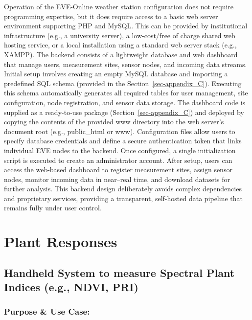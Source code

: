 \documentclass[
  11pt,
  letterpaper,
]{book}
\begin{document}
Operation of the EVE-Online weather station configuration does not
require programming expertise, but it does require access to a basic web
server environment supporting PHP and MySQL. This can be provided by
institutional infrastructure (e.g., a university server), a
low-cost/free of charge shared web hosting service, or a local
installation using a standard web server stack (e.g., XAMPP). The
backend consists of a lightweight database and web dashboard that manage
users, measurement sites, sensor nodes, and incoming data streams.
Initial setup involves creating an empty MySQL database and importing a
predefined SQL schema (provided in the Section~\ref{sec-appendix_C}).
Executing this schema automatically generates all required tables for
user management, site configuration, node registration, and sensor data
storage. The dashboard code is supplied as a ready-to-use package
(Section~\ref{sec-appendix_C}) and deployed by copying the contents of
the provided www directory into the web server's document root (e.g.,
public\_html or www). Configuration files allow users to specify
database credentials and define a secure authentication token that links
individual EVE nodes to the backend. Once configured, a single
initialization script is executed to create an administrator account.
After setup, users can access the web-based dashboard to register
measurement sites, assign sensor nodes, monitor incoming data in
near--real time, and download datasets for further analysis. This
backend design deliberately avoids complex dependencies and proprietary
services, providing a transparent, self-hosted data pipeline that
remains fully under user control.

\section{Plant Responses}\label{sec-plant-responses}

\subsection{Handheld System to measure Spectral Plant Indices (e.g.,
NDVI, PRI)}\label{sec-handheld-spectral}

\subsubsection{Purpose \& Use
Case:}\label{sec-handheld-spectral-purpose}
\end{document}
